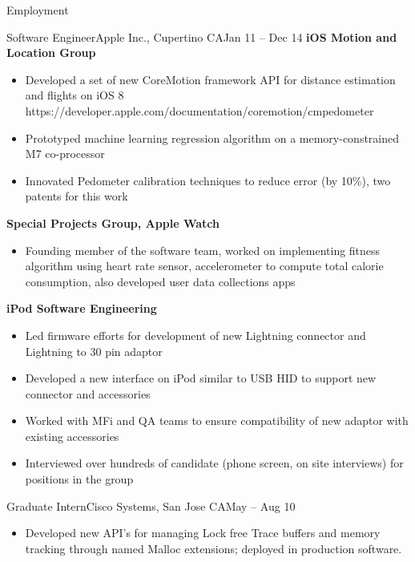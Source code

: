 \documentclass[]{mcdowellcv}
\begin{document}
\begin{cvsection}{Employment}
		\begin{cvsubsection}{Software Engineer}{Apple Inc., Cupertino CA}{Jan 11 -- Dec 14}	
			\textbf{iOS Motion and Location Group}
			\begin{itemize}
				\item Developed a set of new CoreMotion framework API for distance estimation and flights on iOS 8 https://developer.apple.com/documentation/coremotion/cmpedometer
				\item Prototyped machine learning regression algorithm on a memory-constrained M7 co-processor
				\item Innovated Pedometer calibration techniques to reduce error (by 10\%), two patents for this work
			\end{itemize}

			\textbf{Special Projects Group, Apple Watch}
			\begin{itemize}
				\item Founding member of the software team, worked on implementing fitness algorithm using heart rate sensor, accelerometer to compute total calorie consumption, also developed user data collections apps
			\end{itemize}

			\textbf{iPod Software Engineering}
			\begin{itemize}
				\item Led firmware efforts for development of new Lightning connector and Lightning to 30 pin adaptor
				\item Developed a new interface on iPod similar to USB HID to support new connector and accessories
				\item Worked with MFi and QA teams to ensure compatibility of new adaptor with existing accessories
				\item Interviewed over hundreds of candidate (phone screen, on site interviews) for positions in the group
			\end{itemize}
		\end{cvsubsection}
		
		\begin{cvsubsection}{Graduate Intern}{Cisco Systems, San Jose CA}{May -- Aug 10}
			\begin{itemize}
				\item Developed new API’s for managing Lock free Trace buffers and memory tracking through named Malloc extensions; deployed in production software.
			\end{itemize}
		\end{cvsubsection}


\end{cvsection}
\end{document}
